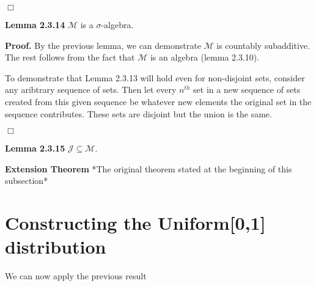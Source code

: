 \documentclass{article}
\begin{document}
\hfill $\Box$

\medskip

\noindent \textbf{Lemma 2.3.14} $\mathcal{M}$ is a $\sigma$-algebra. 

\medskip

\noindent \textbf{Proof.} By the previous lemma, we can demonstrate $\mathcal{M}$ is countably subadditive. The rest follows from the fact that $\mathcal{M}$ is an algebra (lemma 2.3.10).

To demonstrate that Lemma 2.3.13 will hold even for non-disjoint sets, consider any aribtrary sequence of sets. Then let every $n^{th}$ set in a new sequence of sets created from this given sequence be whatever new elements the original set in the sequence contributes. These sets are disjoint but the union is the same. 

\hfill $\Box$

\medskip

\noindent \textbf{Lemma 2.3.15} $\mathcal{J} \subseteq \mathcal{M}$. 



\medskip

\noindent \textbf{Extension Theorem} *The original theorem stated at the beginning of this subsection*


\section{Constructing the Uniform[0,1] distribution}

We can now apply the previous result 
\end{document}
